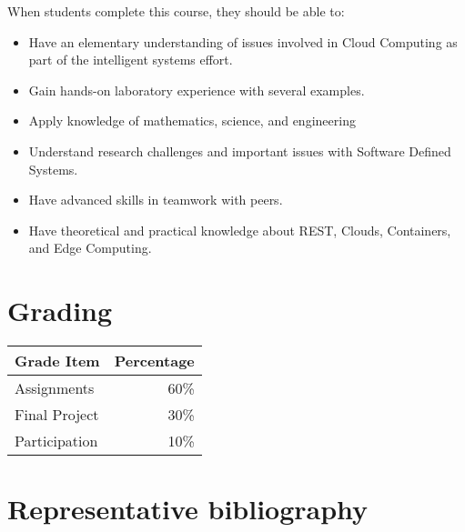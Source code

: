 When students complete this course, they should be able to:

\begin{itemize}
\item Have an elementary understanding of issues involved in Cloud
  Computing as part of the intelligent systems effort.
\item Gain hands-on laboratory experience with several examples.
\item Apply knowledge of mathematics, science, and engineering
\item Understand research challenges and important issues with
  Software Defined Systems.
\item	Have advanced skills in teamwork with peers.
\item Have theoretical and practical knowledge about REST, Clouds,
  Containers, and Edge Computing.
\end{itemize}


\section{Grading}

\begin{tabular}{lr}
  Grade Item	  & Percentage\\
  \hline
  Assignments	  & 60\%\\
  Final Project	& 30\%\\
  Participation	& 10\%\\
  \hline
\end{tabular}


\section{Representative bibliography}


